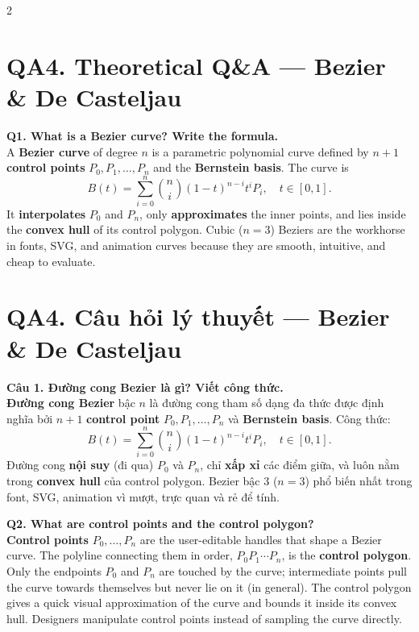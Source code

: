 \begin{paracol}{2}
\section*{QA4. Theoretical Q\&A — Bezier \& De Casteljau}

\textbf{Q1. What is a Bezier curve? Write the formula.}\\
A \textbf{Bezier curve} of degree $n$ is a parametric polynomial curve defined by $n+1$ \textbf{control points} $P_0, P_1, \ldots, P_n$ and the \textbf{Bernstein basis}. The curve is
\[ B(t) = \sum_{i=0}^{n} \binom{n}{i}(1-t)^{n-i} t^{i} P_i, \quad t \in [0,1]. \]
It \textbf{interpolates} $P_0$ and $P_n$, only \textbf{approximates} the inner points, and lies inside the \textbf{convex hull} of its control polygon. Cubic ($n=3$) Beziers are the workhorse in fonts, SVG, and animation curves because they are smooth, intuitive, and cheap to evaluate.

\switchcolumn

\section*{QA4. Câu hỏi lý thuyết — Bezier \& De Casteljau}

\textbf{Câu 1. Đường cong Bezier là gì? Viết công thức.}\\
\textbf{Đường cong Bezier} bậc $n$ là đường cong tham số dạng đa thức được định nghĩa bởi $n+1$ \textbf{control point} $P_0, P_1, \ldots, P_n$ và \textbf{Bernstein basis}. Công thức:
\[ B(t) = \sum_{i=0}^{n} \binom{n}{i}(1-t)^{n-i} t^{i} P_i, \quad t \in [0,1]. \]
Đường cong \textbf{nội suy} (đi qua) $P_0$ và $P_n$, chỉ \textbf{xấp xỉ} các điểm giữa, và luôn nằm trong \textbf{convex hull} của control polygon. Bezier bậc 3 ($n=3$) phổ biến nhất trong font, SVG, animation vì mượt, trực quan và rẻ để tính.

\switchcolumn*

\textbf{Q2. What are control points and the control polygon?}\\
\textbf{Control points} $P_0, \ldots, P_n$ are the user-editable handles that shape a Bezier curve. The polyline connecting them in order, $P_0 P_1 \cdots P_n$, is the \textbf{control polygon}. Only the endpoints $P_0$ and $P_n$ are touched by the curve; intermediate points pull the curve towards themselves but never lie on it (in general). The control polygon gives a quick visual approximation of the curve and bounds it inside its convex hull. Designers manipulate control points instead of sampling the curve directly.


\end{paracol}
